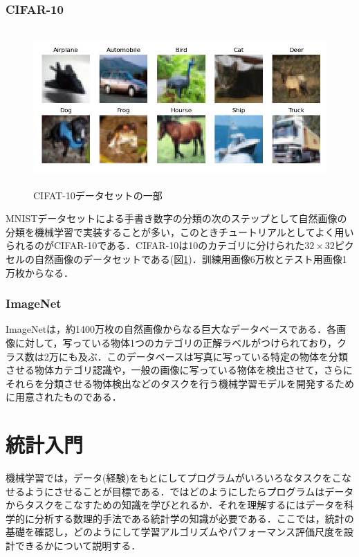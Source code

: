 \documentclass[a4paper,11pt]{jsreport}
\begin{document}
\subsubsection{CIFAR-10}
\begin{figure}[H]
  \begin{center}
      \includegraphics[height=6cm]{image/CIFAR10.png}
      \caption{CIFAT-10データセットの一部}
      \label{CIFAR10}
  \end{center}
\end{figure}
MNISTデータセットによる手書き数字の分類の次のステップとして自然画像の分類を機械学習で実装することが多い，このときチュートリアルとしてよく用いられるのがCIFAR-10である．CIFAR-10は10のカテゴリに分けられた$32 \times 32$ピクセルの自然画像のデータセットである(図\ref{CIFAR10})．訓練用画像6万枚とテスト用画像1万枚からなる．

\subsubsection{ImageNet}
ImageNetは，約1400万枚の自然画像からなる巨大なデータベースである．各画像に対して，写っている物体1つのカテゴリの正解ラベルがつけられており，クラス数は2万にも及ぶ．このデータベースは写真に写っている特定の物体を分類させる物体カテゴリ認識や，一般の画像に写っている物体を検出させて，さらにそれらを分類させる物体検出などのタスクを行う機械学習モデルを開発するために用意されたものである．

\section{統計入門}
機械学習では，データ(経験)をもとにしてプログラムがいろいろなタスクをこなせるようにさせることが目標である．ではどのようにしたらプログラムはデータからタスクをこなすための知識を学びとれるか．それを理解するにはデータを科学的に分析する数理的手法である統計学の知識が必要である．ここでは，統計の基礎を確認し，どのようにして学習アルゴリズムやパフォーマンス評価尺度を設計できるかについて説明する．
\end{document}
